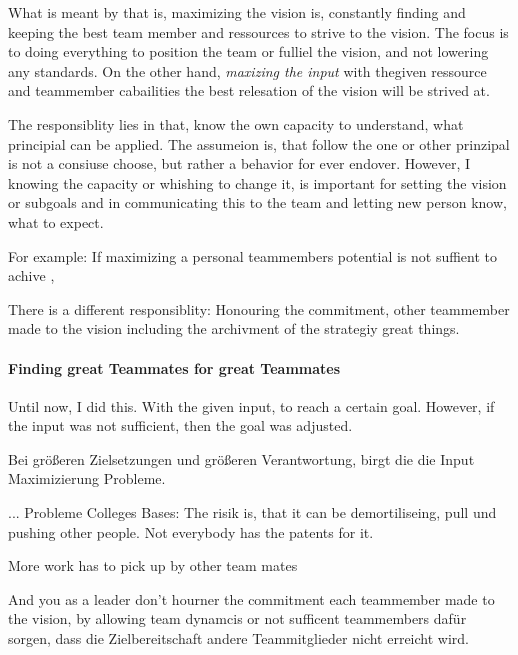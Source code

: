 What is meant by that is, maximizing the vision is, constantly finding and keeping the best team member and ressources to strive to the vision. The focus is to doing everything to position the team or fulliel the vision, and not lowering any standards. On the other hand, \textit{maxizing the input} with thegiven ressource and teammember cabailities the best relesation of the vision will be strived at.

The responsiblity lies in that, know the own capacity to understand, what principial can be applied. The assumeion is, that follow the one or other prinzipal is not a consiuse choose, but rather a behavior for ever endover. However, I knowing the capacity or whishing to change it, is important for setting the vision or subgoals and in communicating this to the team and letting new person know, what to expect.

For example: If maximizing a personal teammembers potential is not suffient to achive ,


There is a different responsiblity: Honouring the commitment, other teammember made to the vision including the archivment of the strategiy great things.

\paragraph{Finding great Teammates for great Teammates}






Until now, I did this. With the given input, to reach a certain goal. However, if the input was not sufficient, then the goal was adjusted.

Bei größeren Zielsetzungen und größeren Verantwortung, birgt die die Input Maximizierung Probleme.

... Probleme
Colleges Bases: The risik is, that it can be demortiliseing, pull und pushing other people. Not everybody has the patents for it.

More work has to pick up by other team mates

And you as a leader don't hourner the commitment each teammember made to the vision, by allowing team dynamcis or not sufficent teammembers dafür sorgen, dass die Zielbereitschaft andere Teammitglieder nicht erreicht wird.


